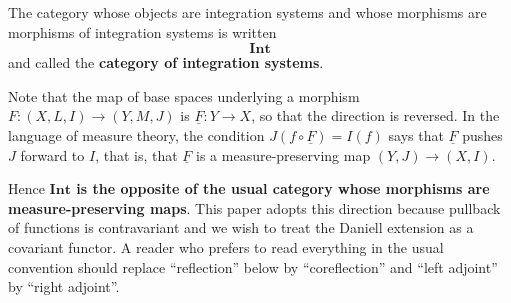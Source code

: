 \begin{definition}
  The category whose objects are integration systems and whose morphisms are
  morphisms of integration systems is written
  \[
    \mathbf{Int}
  \]
  and called the \textbf{category of integration systems}.
\end{definition}

\begin{remark}\label{rem:opposite-convention}
  Note that the map of base spaces underlying a morphism
  $F:(X,L,I)\to(Y,M,J)$ is $\underline{F}:Y\to X$, so that the direction is
  reversed.
  In the language of measure theory, the condition
  $J(f\circ\underline{F})=I(f)$ says that $\underline{F}$ pushes $J$ forward to
  $I$, that is, that $\underline{F}$ is a measure-preserving map
  $(Y,J)\to(X,I)$.

  Hence \textbf{$\mathbf{Int}$ is the opposite of the usual category whose
  morphisms are measure-preserving maps}.
  This paper adopts this direction because pullback of functions is
  contravariant and we wish to treat the Daniell extension as a covariant
  functor.
  A reader who prefers to read everything in the usual convention should replace
  ``reflection'' below by ``coreflection'' and ``left adjoint'' by
  ``right adjoint''.
\end{remark}
